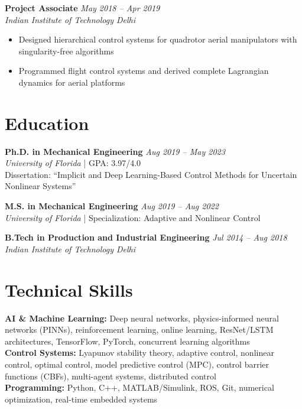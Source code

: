 \documentclass[10pt, letterpaper]{article}
\begin{document}
\textbf{Project Associate} \hfill \textit{May 2018 -- Apr 2019}\\
\textit{Indian Institute of Technology Delhi}
\begin{itemize}[leftmargin=20pt, itemsep=1pt]
    \item Designed hierarchical control systems for quadrotor aerial manipulators with singularity-free algorithms
    \item Programmed flight control systems and derived complete Lagrangian dynamics for aerial platforms
\end{itemize}

    \section{Education}

\textbf{Ph.D. in Mechanical Engineering} \hfill \textit{Aug 2019 -- May 2023}\\
\textit{University of Florida} | GPA: 3.97/4.0\\
Dissertation: ``Implicit and Deep Learning-Based Control Methods for Uncertain Nonlinear Systems''

\textbf{M.S. in Mechanical Engineering} \hfill \textit{Aug 2019 -- Aug 2022}\\
\textit{University of Florida} | Specialization: Adaptive and Nonlinear Control

\textbf{B.Tech in Production and Industrial Engineering} \hfill \textit{Jul 2014 -- Aug 2018}\\
\textit{Indian Institute of Technology Delhi}

\section{Technical Skills}

\textbf{AI \& Machine Learning:} Deep neural networks, physics-informed neural networks (PINNs), reinforcement learning, online learning, ResNet/LSTM architectures, TensorFlow, PyTorch, concurrent learning algorithms\\

\textbf{Control Systems:} Lyapunov stability theory, adaptive control, nonlinear control, optimal control, model predictive control (MPC), control barrier functions (CBFs), multi-agent systems, distributed control\\

\textbf{Programming:} Python, C++, MATLAB/Simulink, ROS, Git, numerical optimization, real-time embedded systems\\
\end{document}
